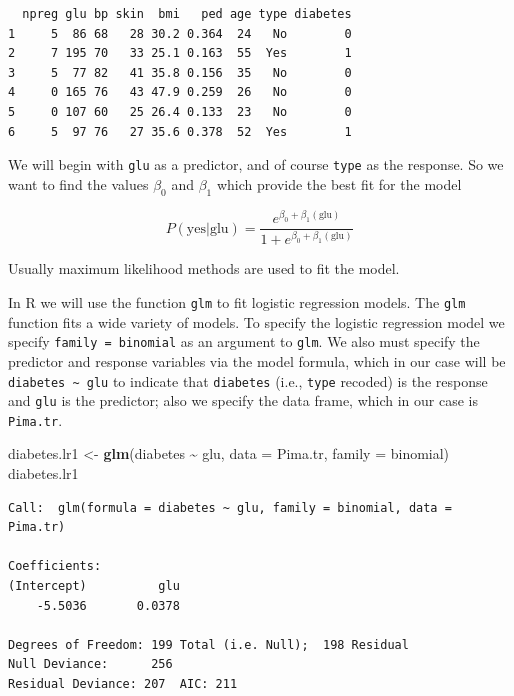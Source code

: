 \documentclass[
]{krantz}
\makeatletter
\newenvironment{Shaded}{\begin{snugshade}}{\end{snugshade}}
\newcommand{\DataTypeTok}[1]{\textcolor[rgb]{0.27,0.27,0.27}{#1}}
\newcommand{\KeywordTok}[1]{\textcolor[rgb]{0.27,0.27,0.27}{\textbf{#1}}}
\newcommand{\NormalTok}[1]{#1}
\newcommand{\OperatorTok}[1]{\textcolor[rgb]{0.43,0.43,0.43}{\textbf{#1}}}
\newcommand{\StringTok}[1]{\textcolor[rgb]{0.5,0.5,0.5}{#1}}
\newenvironment{kframe}{%
\medskip{}
\setlength{\fboxsep}{.8em}
 \def\at@end@of@kframe{}%
 \ifinner\ifhmode%
  \def\at@end@of@kframe{\end{minipage}}%
  \begin{minipage}{\columnwidth}%
 \fi\fi%
 \def\FrameCommand##1{\hskip\@totalleftmargin \hskip-\fboxsep
 \colorbox{shadecolor}{##1}\hskip-\fboxsep
     \hskip-\linewidth \hskip-\@totalleftmargin \hskip\columnwidth}%
 \MakeFramed {\advance\hsize-\width
   \@totalleftmargin\z@ \linewidth\hsize
   \@setminipage}}%
 {\par\unskip\endMakeFramed%
 \at@end@of@kframe}
\renewenvironment{Shaded}{\begin{kframe}}{\end{kframe}}
\makeatother
\begin{document}
\begin{verbatim}
  npreg glu bp skin  bmi   ped age type diabetes
1     5  86 68   28 30.2 0.364  24   No        0
2     7 195 70   33 25.1 0.163  55  Yes        1
3     5  77 82   41 35.8 0.156  35   No        0
4     0 165 76   43 47.9 0.259  26   No        0
5     0 107 60   25 26.4 0.133  23   No        0
6     5  97 76   27 35.6 0.378  52  Yes        1
\end{verbatim}

We will begin with \texttt{glu} as a predictor, and of course \texttt{type} as the response. So we want to find the values \(\beta_0\) and \(\beta_1\) which provide the best fit for the model

\[
P(\text{yes} | \text{glu}) = \frac{e^{\beta_0 + \beta_1 (\text{glu})}}{1 + e^{\beta_0 + \beta_1 (\text{glu})}}
\]

Usually maximum likelihood methods are used to fit the model.

In R we will use the function \texttt{glm} to fit logistic regression models. The \texttt{glm} function fits a wide variety of models. To specify the logistic regression model we specify \texttt{family\ =\ binomial} as an argument to \texttt{glm}. We also must specify the predictor and response variables via the model formula, which in our case will be \texttt{diabetes\ \textasciitilde{}\ glu} to indicate that \texttt{diabetes} (i.e., \texttt{type} recoded) is the response and \texttt{glu} is the predictor; also we specify the data frame, which in our case is \texttt{Pima.tr}.

\begin{Shaded}
\begin{Highlighting}[]
\NormalTok{diabetes.lr1 \textless{}{-}}\StringTok{ }\KeywordTok{glm}\NormalTok{(diabetes }\OperatorTok{\textasciitilde{}}\StringTok{ }\NormalTok{glu, }\DataTypeTok{data =}\NormalTok{ Pima.tr, }\DataTypeTok{family =}\NormalTok{ binomial)}
\NormalTok{diabetes.lr1}
\end{Highlighting}
\end{Shaded}

\begin{verbatim}
Call:  glm(formula = diabetes ~ glu, family = binomial, data = Pima.tr)

Coefficients:
(Intercept)          glu  
    -5.5036       0.0378  

Degrees of Freedom: 199 Total (i.e. Null);  198 Residual
Null Deviance:	    256 
Residual Deviance: 207 	AIC: 211
\end{verbatim}
\end{document}
